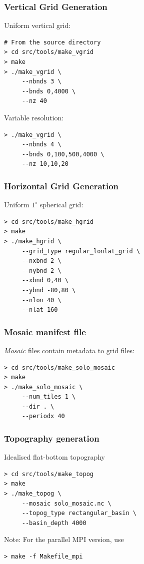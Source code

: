 \documentclass{beamer}
\begin{document}
\begin{frame}[fragile]
    \frametitle{Vertical Grid Generation}
    
    Uniform vertical grid:
    \begin{lstlisting}
# From the source directory
> cd src/tools/make_vgrid
> make
> ./make_vgrid \
     --nbnds 3 \
     --bnds 0,4000 \
     --nz 40
    \end{lstlisting}
    
    Variable resolution:
    \begin{lstlisting}
> ./make_vgrid \
     --nbnds 4 \
     --bnds 0,100,500,4000 \
     --nz 10,10,20
    \end{lstlisting}
\end{frame}
\begin{frame}[fragile]
    \frametitle{Horizontal Grid Generation}
   
    Uniform $1^\circ$ spherical grid:
    \begin{lstlisting}
> cd src/tools/make_hgrid
> make
> ./make_hgrid \
     --grid_type regular_lonlat_grid \
     --nxbnd 2 \
     --nybnd 2 \
     --xbnd 0,40 \
     --ybnd -80,80 \
     --nlon 40 \
     --nlat 160
    \end{lstlisting}
\end{frame}

\begin{frame}[fragile]
    \frametitle{Mosaic manifest file}
    
    \textit{Mosaic} files contain metadata to grid files:
    \begin{lstlisting}
> cd src/tools/make_solo_mosaic
> make
> ./make_solo_mosaic \
     --num_tiles 1 \
     --dir . \
     --periodx 40
    \end{lstlisting}
\end{frame}

\begin{frame}[fragile]
    \frametitle{Topography generation}
   
    Idealised flat-bottom topography
    \begin{lstlisting}
> cd src/tools/make_topog
> make
> ./make_topog \
     --mosaic solo_mosaic.nc \
     --topog_type rectangular_basin \
     --basin_depth 4000
    \end{lstlisting}

    Note: For the parallel MPI version, use
    \begin{lstlisting}
> make -f Makefile_mpi
    \end{lstlisting}
\end{frame}
\end{document}
